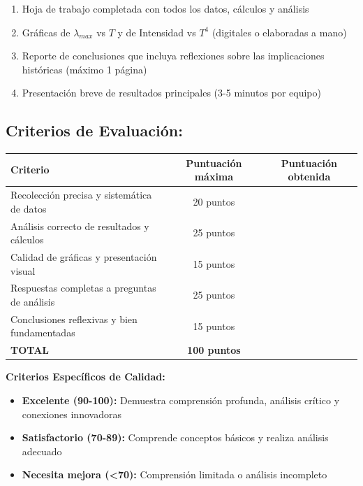 \documentclass[12pt,a4paper]{article}
\begin{document}
	\begin{enumerate}
		\item Hoja de trabajo completada con todos los datos, cálculos y análisis
		\item Gráficas de $\lambda_{max}$ vs $T$ y de Intensidad vs $T^4$ (digitales o elaboradas a mano)
		\item Reporte de conclusiones que incluya reflexiones sobre las implicaciones históricas (máximo 1 página)
		\item Presentación breve de resultados principales (3-5 minutos por equipo)
	\end{enumerate}
	
	\subsection{Criterios de Evaluación:}
	
	\begin{center}
		\begin{tabular}{|l|c|c|}
			\hline
			\textbf{Criterio} & \textbf{Puntuación máxima} & \textbf{Puntuación obtenida} \\
			\hline
			Recolección precisa y sistemática de datos & 20 puntos & \\
			\hline
			Análisis correcto de resultados y cálculos & 25 puntos & \\
			\hline
			Calidad de gráficas y presentación visual & 15 puntos & \\
			\hline
			Respuestas completas a preguntas de análisis & 25 puntos & \\
			\hline
			Conclusiones reflexivas y bien fundamentadas & 15 puntos & \\
			\hline
			\textbf{TOTAL} & \textbf{100 puntos} & \\
			\hline
		\end{tabular}
	\end{center}
	
	\begin{notabox}
		\textbf{Criterios Específicos de Calidad:}
		\begin{itemize}
			\item \textbf{Excelente (90-100):} Demuestra comprensión profunda, análisis crítico y conexiones innovadoras
			\item \textbf{Satisfactorio (70-89):} Comprende conceptos básicos y realiza análisis adecuado
			\item \textbf{Necesita mejora (<70):} Comprensión limitada o análisis incompleto
		\end{itemize}
	\end{notabox}
	
\end{document}
